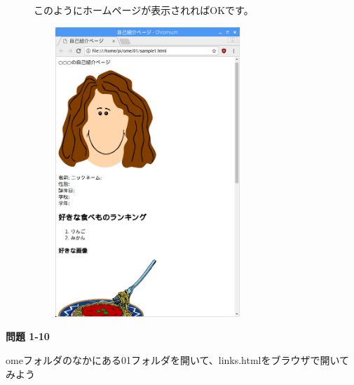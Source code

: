 \documentclass[a4paper,12pt]{jarticle}
\begin{document}
\begin{figure}[hb]
  \centering
  \begin{minipage}{16.574cm}
    このようにホームページが表示されればOKです。

    \centering
    \includegraphics[width=8.588cm,height=10.933cm]{textbook-img142.png}
  \end{minipage}

\end{figure}
{\bfseries
問題 1-10}

omeフォルダのなかにある01フォルダを開いて、links.htmlをブラウザで開いてみよう


\bigskip

\vfill
\end{document}
